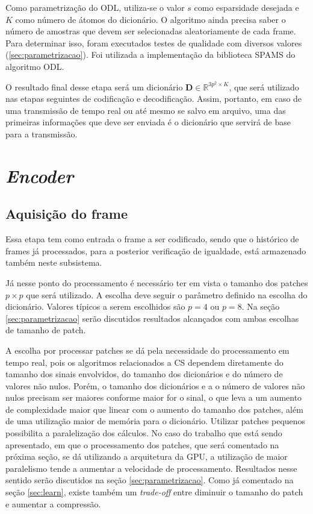 \documentclass[cic,tc]{iiufrgs}
\newcommand{\mat}[1]{\bm{#1}}
\begin{document}
Como parametrização do ODL, utiliza-se o valor $s$ como esparsidade desejada e
$K$ como número de átomos do dicionário.
O algoritmo ainda precisa saber o número de amostras que devem ser selecionadas aleatoriamente
de cada frame.
Para determinar isso, foram executados testes de qualidade com diversos valores
(\ref{sec:parametrizacao}).
Foi utilizada a implementação da biblioteca SPAMS \cite{SPAMS} do algoritmo ODL.

O resultado final desse etapa será um dicionário $\mat{D} \in \mathbb{R}^{3p^2 \times K}$,
que será utilizado nas etapas seguintes de codificação e decodificação.
Assim, portanto, em caso de uma transmissão de tempo real ou até mesmo se salvo em arquivo,
uma das primeiras informações que deve ser enviada é o dicionário que servirá de base
para a transmissão.


\section{\textit{Encoder}}
\subsection{Aquisição do frame}
\label{sec:frameaquisition}
Essa etapa tem como entrada o frame a ser codificado, sendo que o histórico de frames já
processados, para a posterior verificação de igualdade, está armazenado também neste
subsistema.

Já nesse ponto do processamento é necessário ter em vista o tamanho dos patches $p\times p$
que será utilizado. A escolha deve seguir o parâmetro definido na escolha do dicionário.
Valores típicos a serem escolhidos são $p=4$ ou $p=8$. Na seção \ref{sec:parametrizacao} serão 
discutidos resultados alcançados com ambas escolhas de tamanho de patch.

A escolha por processar patches se dá pela necessidade do processamento em tempo real, pois 
os algoritmos relacionados a CS dependem diretamente do tamanho
dos sinais envolvidos, do tamanho dos dicionários e do número de valores não nulos.
Porém, o tamanho dos dicionários e a o número de valores não nulos precisam ser maiores conforme maior for 
o sinal, o que leva a um aumento de complexidade maior que linear com o aumento do tamanho dos
patches, além de uma utilização maior de memória para o dicionário.
Utilizar patches pequenos possibilita a paralelização dos cálculos.
No caso do trabalho que está sendo apresentado, em que o processamento dos patches, que será 
comentado na próxima seção, se dá utilizando a arquitetura da GPU, a utilização de maior 
paralelismo tende a aumentar a velocidade de processamento.
Resultados nesse sentido serão discutidos na seção \ref{sec:parametrizacao}.
Como já comentado na seção \autoref{sec:learn}, existe também um \textit{trade-off} entre 
diminuir o tamanho do patch e aumentar a compressão.
\end{document}
